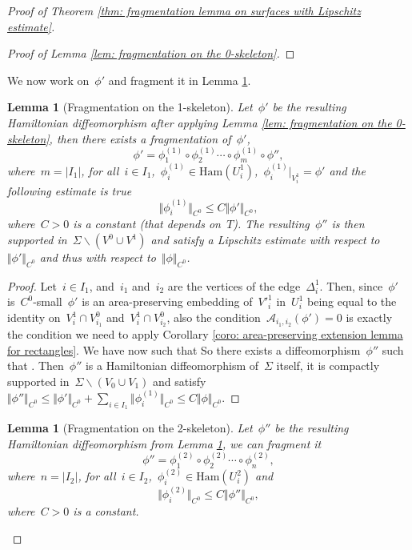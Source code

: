 \documentclass[10pt]{amsart}
\newtheorem{lemma}[prop]{Lemma}
\newcommand{\Ham}{\mathrm{Ham}}
\begin{document}
\begin{proof}[Proof of Theorem \ref{thm: fragmentation lemma on surfaces with Lipschitz estimate}]
\begin{proof}[Proof of Lemma \ref{lem: fragmentation on the 0-skeleton}]
\end{proof}

We now work on~$\phi'$ and fragment it in Lemma \ref{lem: fragmentation on the 1-skeleton}.

\begin{lemma}[Fragmentation on the 1-skeleton]\label{lem: fragmentation on the 1-skeleton}
Let~$\phi'$ be the resulting Hamiltonian diffeomorphism after applying Lemma \ref{lem: fragmentation on the 0-skeleton}, then there exists a fragmentation of~$\phi'$,
$$\phi'=\phi_1^{(1)}\circ \phi_2^{(1)}\cdots \circ \phi_m^{(1)}\circ \phi'',$$
where~$m=\vert I_1 \vert$, for all~$i \in I_1$,~$\phi_i^{(1)} \in \Ham(U_i^1)$,~$\phi_i^{(1)}\vert_{V_i^1}=\phi'$ and the following estimate is true
$$\Vert \phi_i^{(1)} \Vert_{C^0}\leq C \Vert \phi' \Vert_{C^0},$$
where~$C>0$ is a constant (that depends on~$T$). The resulting~$\phi''$ is then supported in~$\Sigma \backslash (V^0 \cup V^1)$ and satisfy a Lipschitz estimate with respect to~$\Vert\phi' \Vert_{C^0}$ and thus with respect to~$\Vert\phi \Vert_{C^0}$.
\end{lemma}

\begin{proof}
Let~$i\in I_1$, and~$i_1$ and~$i_2$ are the vertices of the edge~$\Delta_i^1$. Then, since~$\phi'$ is~$C^0$-small~$\phi'$ is an area-preserving embedding of~$V'^1_i$ in~$U_i^{1}$ being equal to the identity on~$V_i^1\cap V_{i_1}^0$ and~$V_i^1 \cap V_{i_2}^0$, also the condition~$\mathcal{A}_{i_1,i_2}(\phi')=
0$ is exactly the condition we need to apply Corollary \ref{coro: area-preserving extension lemma for rectangles}. We have now \smash[t]{$\phi_i^{(1)} \in \Ham(U_i^1)$} such that  So there exists a diffeomorphism~$\phi''$ such that . Then~$\phi''$ is a Hamiltonian diffeomorphism of~$\Sigma$ itself, it is compactly supported in~$\Sigma \backslash (V_0 \cup V_1)$ and satisfy~$\Vert \phi'' \Vert_{C^0}\leq \Vert \phi' \Vert_{C^0}+\sum_{i\in I_1} \Vert\phi_i^{(1)}\Vert_{C^0}\leq C \Vert\phi \Vert_{C^0}$.
\end{proof}

\begin{lemma}[Fragmentation on the 2-skeleton]\label{lem: fragmentation on the 2-skeleton}
Let~$\phi''$ be the resulting Hamiltonian diffeomorphism from Lemma \ref{lem: fragmentation on the 1-skeleton}, we can fragment it
$$\phi''=\phi_1^{(2)}\circ \phi_2^{(2)}\cdots \circ \phi_n^{(2)},$$
where~$n=\vert I_2 \vert$, for all~$i \in I_2$,~$\phi_i^{(2)}\in \Ham(U_i^2)$ and~$$\Vert \phi_i^{(2)} \Vert_{C^0}\leq C \Vert \phi'' \Vert_{C^0},$$
where~$C>0$ is a constant.


\end{lemma}
\end{proof}
\end{document}
